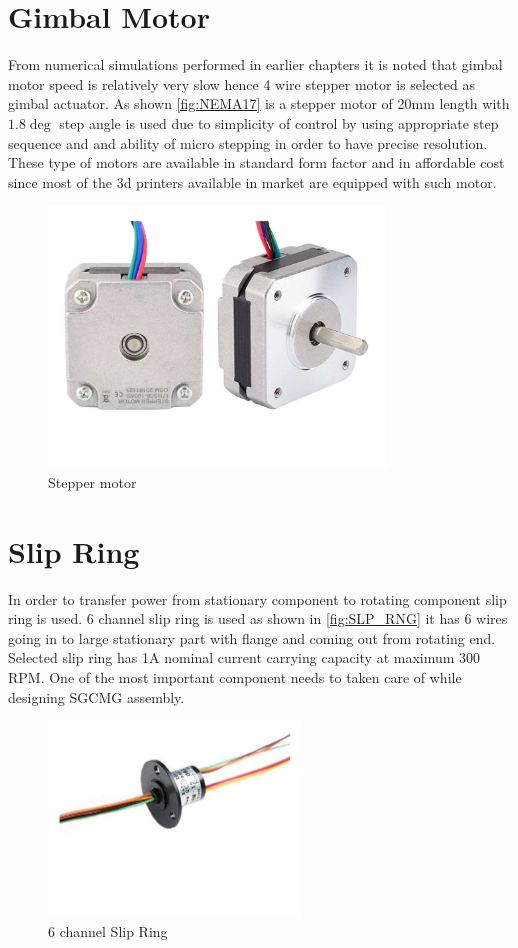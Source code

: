 \section{Gimbal Motor}
From numerical simulations performed in earlier chapters it is noted that gimbal motor speed is relatively very slow hence 4 wire stepper motor is selected as gimbal actuator. As shown \autoref{fig:NEMA17} is a stepper motor of 20mm length with $1.8 \deg$ step angle \cite{web:ds_nema17} is used due to simplicity of control by using appropriate step sequence and and ability of micro stepping in order to have precise resolution. These type of motors are available in standard form factor and in affordable cost since most of the 3d printers available in market are equipped with such motor. 
\begin{figure}[ht]
    \centering
    \includegraphics[width=0.80\textwidth]{figures/Assembly/NEMA17.pdf}
    \caption{Stepper motor \cite{web:ds_nema17}}
    \label{fig:NEMA17}
\end{figure}
\section{Slip Ring}
In order to transfer power from stationary component to rotating component slip ring is used. 6 channel slip ring is used as shown in \autoref{fig:SLP_RNG} it has 6 wires going in to large stationary part with flange and coming out from rotating end. Selected slip ring has 1A nominal current carrying capacity at maximum 300 RPM. One of the most important component needs to taken care of while designing SGCMG assembly.

\begin{figure}[ht]
    \centering
    \includegraphics[width=0.60\textwidth]{figures/Assembly/SLP_RNG.pdf}
    \caption{6 channel Slip Ring}
    \label{fig:SLP_RNG}
\end{figure}


